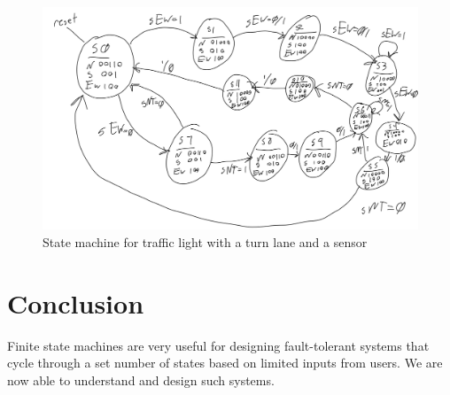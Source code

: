 \documentclass[11pt]{article}
\begin{document}
\begin{figure}[H]
\begin{center}
	\includegraphics[width=\textwidth]{./9images/trafficLightWithSensorTurn.png}
	\caption{\label{fig:trafficLightWithSensorTurn}State machine for traffic light with a turn lane and a sensor}
\end{center}
\end{figure}

\section{Conclusion}
Finite state machines are very useful for designing fault-tolerant systems that cycle through a set number of states based on limited inputs from users. We are now able to understand and design such systems.
\end{document}
